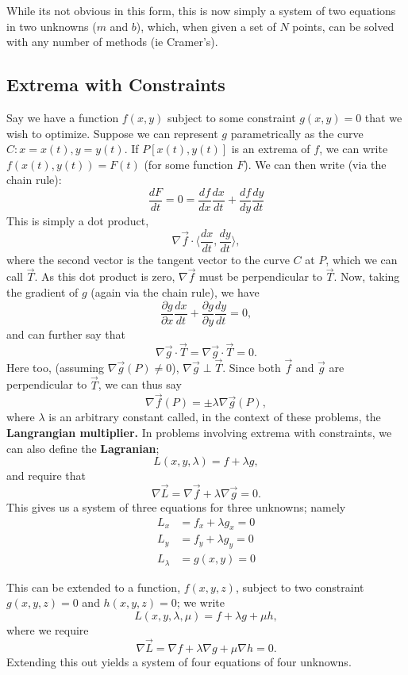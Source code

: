 \documentclass[12pt]{article}
\begin{document}
{While its not obvious in this form, this is now simply a system of two equations in two unknowns ($m$ and $b$), which, when given a set of $N$ points, can be solved with any number of methods (ie Cramer's).

\subsection{Extrema with Constraints}

Say we have a function $f(x,y)$ subject to some constraint $g(x,y) = 0$ that we wish to optimize. Suppose we can represent $g$ parametrically as the curve $C: x = x(t), y = y(t)$. If $P[x(t), y(t)]$ is an extrema of $f$, we can write $f(x(t), y(t)) = F(t)$ (for some function $F$). We can then write (via the chain rule): \[\frac{dF}{dt} = 0 = \frac{df}{dx} \frac{dx}{dt} + \frac{df}{dy}\frac{dy}{dt}\] This is simply a dot product, \[\nabla \vec{f} \cdot \langle \frac{dx}{dt}, \frac{dy}{dt} \rangle, \] where the second vector is the tangent vector to the curve $C$ at $P$, which we can call $\vec{T}$. As this dot product is zero, $\nabla \vec{f}$ must be perpendicular to $\vec{T}$. Now, taking the gradient of $g$ (again via the chain rule), we have \[\frac{\partial g}{\partial x} \frac{dx}{dt} + \frac{\partial g}{\partial y} \frac{dy}{dt} = 0,\] and can further say that \[\nabla \vec{g} \cdot \vec{T}= \nabla \vec{g} \cdot \vec{T} = 0 .\] Here too, (assuming $\nabla \vec{g}(P) \neq 0$), $\nabla \vec{g} \perp \vec{T}$. Since both $\vec{f}$ and $\vec{g}$ are perpendicular to $\vec{T}$, we can thus say \[\nabla \vec{f}(P) = \pm \lambda \nabla \vec{g}(P),\] where $\lambda$ is an arbitrary constant called, in the context of these problems, the \textbf{Langrangian multiplier.} In problems involving extrema with constraints, we can also define the \textbf{Lagranian}; \[L(x,y, \lambda) = f + \lambda g,\] and require that \[\nabla \vec{L} = \nabla \vec{f}  + \lambda \nabla \vec{g} = 0.\] This gives us a system of three equations for three unknowns; namely \begin{align*}
    L_x &= f_x + \lambda g_x = 0\\
    L_y &= f_y + \lambda g_y = 0\\
    L_{\lambda} &= g(x,y) = 0
\end{align*}

This can be extended to a function, $f(x,y,z)$, subject to two constraint $g(x,y,z) = 0$ and $h(x,y,z) = 0$; we write \[L(x,y,\lambda, \mu) = f + \lambda g + \mu h,\] where we require \[\nabla \vec{L} = \nabla f + \lambda \nabla g + \mu \nabla h = 0.\] Extending this out yields a system of four equations of four unknowns.

}
\end{document}
